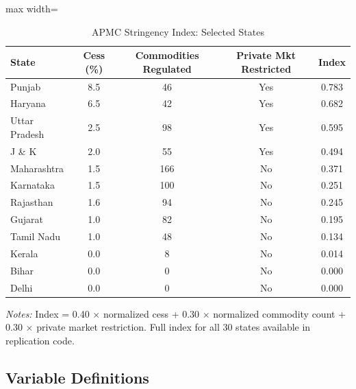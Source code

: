 \documentclass[12pt]{article}
\begin{document}
\begin{table}[H]
\centering
\caption{APMC Stringency Index: Selected States}
\begin{adjustbox}{max width=\textwidth}
\begin{tabular}{lcccc}
\toprule
State & Cess (\%) & Commodities Regulated & Private Mkt Restricted & Index \\
\midrule
Punjab & 8.5 & 46 & Yes & 0.783 \\
Haryana & 6.5 & 42 & Yes & 0.682 \\
Uttar Pradesh & 2.5 & 98 & Yes & 0.595 \\
J \& K & 2.0 & 55 & Yes & 0.494 \\
Maharashtra & 1.5 & 166 & No & 0.371 \\
Karnataka & 1.5 & 100 & No & 0.251 \\
Rajasthan & 1.6 & 94 & No & 0.245 \\
Gujarat & 1.0 & 82 & No & 0.195 \\
Tamil Nadu & 1.0 & 48 & No & 0.134 \\
Kerala & 0.0 & 8 & No & 0.014 \\
Bihar & 0.0 & 0 & No & 0.000 \\
Delhi & 0.0 & 0 & No & 0.000 \\
\bottomrule
\end{tabular}
\end{adjustbox}
\par\vspace{0.3em}
{\small\textit{Notes:} Index = 0.40 $\times$ normalized cess + 0.30 $\times$ normalized commodity count + 0.30 $\times$ private market restriction. Full index for all 30 states available in replication code.}
\end{table}

\subsection{Variable Definitions}
\end{document}
